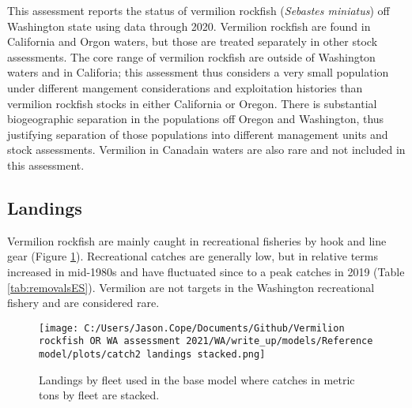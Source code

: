 \documentclass[11pt,
  english,
  a4paper,
]{article}
\begin{document}
This assessment reports the status of vermilion rockfish (\emph{Sebastes miniatus}) off Washington state using data through 2020. Vermilion rockfish are found in California and Orgon waters, but those are treated separately in other stock assessments. The core range of vermilion rockfish are outside of Washington waters and in Califoria; this assessment thus considers a very small population under different mangement considerations and exploitation histories than vermilion rockfish stocks in either California or Oregon. There is substantial biogeographic separation in the populations off Oregon and Washington, thus justifying separation of those populations into different management units and stock assessments. Vermilion in Canadain waters are also rare and not included in this assessment.

\leavevmode\tagmcend\tagstructend\par


\hypertarget{landings}{%
\subsection*{Landings}\label{landings}}

\leavevmode\tagmcend\tagstructend


Vermilion rockfish are mainly caught in recreational fisheries by hook and line gear (Figure \ref{fig:es-catch}). Recreational catches are generally low, but in relative terms increased in mid-1980s and have fluctuated since to a peak catches in 2019 (Table \ref{tab:removalsES}). Vermilion are not targets in the Washington recreational fishery and are considered rare.

\leavevmode\tagmcend\tagstructend\par

\clearpage




\begin{figure}
\centering
\texttt{[image: C:/Users/Jason.Cope/Documents/Github/Vermilion rockfish OR WA assessment 2021/WA/write\_up/models/Reference model/plots/catch2 landings stacked.png]}
\caption{Landings by fleet used in the base model where catches in metric tons by fleet are stacked.\label{fig:es-catch}}
\end{figure}
\end{document}
